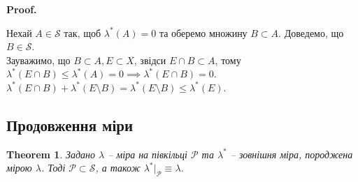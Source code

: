 \documentclass[a4paper, 10pt]{article}
\makeatletter
\theoremstyle{theoremdd}
\newtheorem{theorem}{Theorem}[subsection]
\renewenvironment{proof}[1][Proof.\\]{\par
\pushQED{\hfill \qed}%
\normalfont \topsep6\p@\@plus6\p@\relax
\trivlist
\item\relax
{\bfseries
#1\@addpunct{.}}\hspace\labelsep\ignorespaces
}{%
\popQED\endtrivlist\@endpefalse
}
\makeatother
\begin{document}
\begin{proof}
Нехай $A \in \mathcal{S}$ так, щоб $\lambda^*(A) = 0$ та оберемо множину $B \subset A$. Доведемо, що $B \in \mathcal{S}$.\\
Зауважимо, що $B \subset A, E \subset X$, звідси $E \cap B \subset A$, тому $\lambda^*(E \cap B) \leq \lambda^*(A) = 0 \implies \lambda^*(E \cap B) = 0$.\\
$\lambda^*(E \cap B) + \lambda^*(E \setminus B) = \lambda^*(E \setminus B) \leq \lambda^*(E)$.
\end{proof}

\subsection{Продовження міри}
\begin{theorem}
Задано $\lambda$ -- міра на півкільці $\mathcal{P}$ та $\lambda^*$ -- зовнішня міра, породжена мірою $\lambda$. Тоді $\mathcal{P} \subset \mathcal{S}$, а також $\lambda^*|_\mathcal{P} \equiv \lambda$.
\end{theorem}
\end{document}
